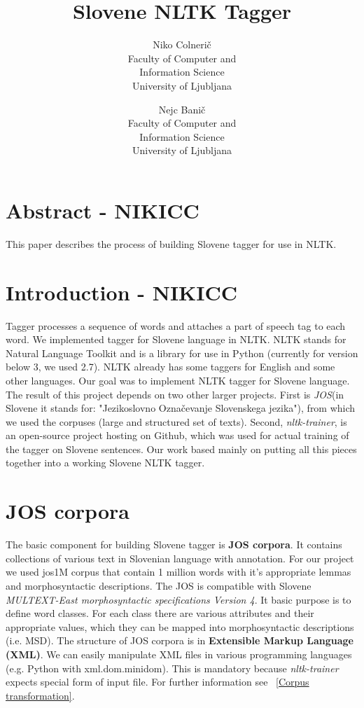 \documentclass[11pt,a4paper,english,twocolumn]{article}
\title{\textbf{Slovene NLTK Tagger}}
\author{
Niko Colnerič \\
\footnotesize Faculty of Computer and \\
\footnotesize Information Science \\
\footnotesize University of Ljubljana \\
\and
Nejc Banič \\
\footnotesize Faculty of Computer and \\
\footnotesize Information Science \\
\footnotesize University of Ljubljana \\
}
\begin{document}
\maketitle
\thispagestyle{empty}

\section*{Abstract - NIKICC}
This paper describes the process of building Slovene tagger for use in NLTK.  
\section{Introduction - NIKICC}
Tagger processes a sequence of words and attaches a part of speech tag to each word. We implemented tagger for Slovene language in NLTK. NLTK stands for Natural Language Toolkit and is a library for use in Python (currently for version below 3, we used 2.7). NLTK already has some taggers for English and some other languages. Our goal was to implement NLTK tagger for Slovene language. The result of this project depends on two other larger projects. First is \textit{JOS}\cite{JOS}(in Slovene it stands for: "Jezikoslovno Označevanje Slovenskega jezika"), from which we used the corpuses (large and structured set of texts). Second, \textit{nltk-trainer}\cite{nltk-trainer}, is an open-source project hosting on Github, which was used for actual training of the tagger on Slovene sentences. Our work based mainly on putting all this pieces together into a working Slovene NLTK tagger.
\section{JOS corpora}
The basic component for building Slovene tagger is \textbf{JOS corpora}. It contains collections of various text in Slovenian language with annotation. For our project we used jos1M corpus that contain 1 million words with it's appropriate lemmas and morphosyntactic descriptions. The JOS is compatible with Slovene\textit{ MULTEXT-East morphosyntactic specifications Version 4}\cite{MULTEXT-East}. It basic purpose is to define word classes. For each class there are various attributes and their appropriate values, which they can be mapped into morphosyntactic descriptions (i.e. MSD). The structure of JOS corpora is in  \textbf{Extensible Markup Language (XML)}. We can easily manipulate XML files in various programming languages (e.g. Python with xml.dom.minidom). This is mandatory because \textit{nltk-trainer}\cite{nltk-trainer} expects special form of input file. For further information see ~\ref{Corpus transformation}.
\end{document}
